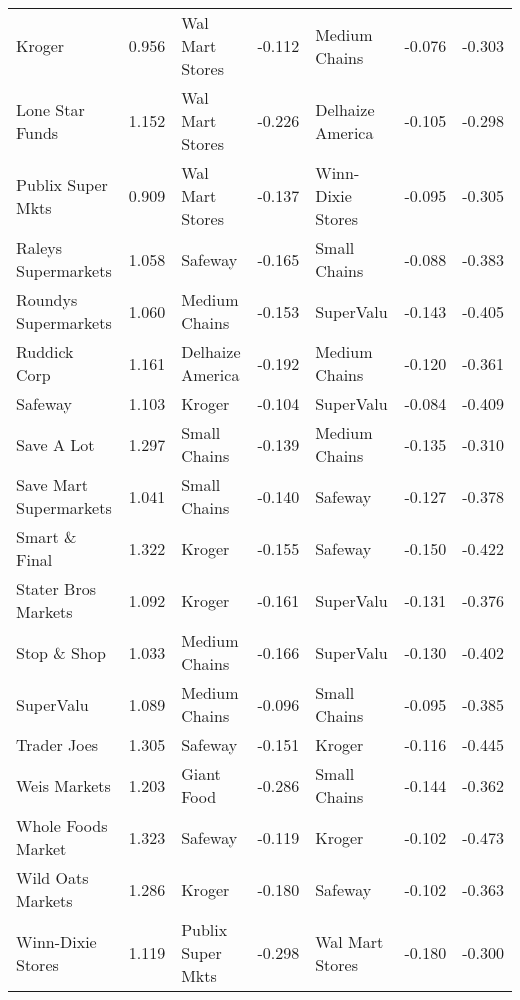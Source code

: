 \begin{table}[htbp]
\begin{tabular}{ll|ll|ll|r}
\textrm{ Kroger  } & 0.956 &\textrm{ Wal Mart Stores } &-0.112 &\textrm{ Medium Chains } &-0.076 & -0.303 \\ 
\textrm{ Lone Star Funds } & 1.152 &\textrm{ Wal Mart Stores } &-0.226 &\textrm{ Delhaize America } &-0.105 & -0.298 \\ 
\textrm{ Publix Super Mkts  } & 0.909 &\textrm{ Wal Mart Stores } &-0.137 &\textrm{ Winn-Dixie Stores  } &-0.095 & -0.305 \\ 
\textrm{ Raleys Supermarkets } & 1.058 &\textrm{ Safeway  } &-0.165 &\textrm{ Small Chains } &-0.088 & -0.383 \\ 
\textrm{ Roundys Supermarkets  } & 1.060 &\textrm{ Medium Chains } &-0.153 &\textrm{ SuperValu  } &-0.143 & -0.405 \\ 
\textrm{ Ruddick Corp } & 1.161 &\textrm{ Delhaize America } &-0.192 &\textrm{ Medium Chains } &-0.120 & -0.361 \\ 
\textrm{ Safeway  } & 1.103 &\textrm{ Kroger  } &-0.104 &\textrm{ SuperValu  } &-0.084 & -0.409 \\ 
\textrm{ Save A Lot } & 1.297 &\textrm{ Small Chains } &-0.139 &\textrm{ Medium Chains } &-0.135 & -0.310 \\ 
\textrm{ Save Mart Supermarkets } & 1.041 &\textrm{ Small Chains } &-0.140 &\textrm{ Safeway  } &-0.127 & -0.378 \\ 
\textrm{ Smart \& Final  } & 1.322 &\textrm{ Kroger  } &-0.155 &\textrm{ Safeway  } &-0.150 & -0.422 \\ 
\textrm{ Stater Bros Markets } & 1.092 &\textrm{ Kroger  } &-0.161 &\textrm{ SuperValu  } &-0.131 & -0.376 \\ 
\textrm{ Stop \& Shop } & 1.033 &\textrm{ Medium Chains } &-0.166 &\textrm{ SuperValu  } &-0.130 & -0.402 \\ 
\textrm{ SuperValu  } & 1.089 &\textrm{ Medium Chains } &-0.096 &\textrm{ Small Chains } &-0.095 & -0.385 \\ 
\textrm{ Trader Joes  } & 1.305 &\textrm{ Safeway  } &-0.151 &\textrm{ Kroger  } &-0.116 & -0.445 \\ 
\textrm{ Weis Markets  } & 1.203 &\textrm{ Giant Food } &-0.286 &\textrm{ Small Chains } &-0.144 & -0.362 \\ 
\textrm{ Whole Foods Market } & 1.323 &\textrm{ Safeway  } &-0.119 &\textrm{ Kroger  } &-0.102 & -0.473 \\ 
\textrm{ Wild Oats Markets  } & 1.286 &\textrm{ Kroger  } &-0.180 &\textrm{ Safeway  } &-0.102 & -0.363 \\ 
\textrm{ Winn-Dixie Stores  } & 1.119 &\textrm{ Publix Super Mkts  } &-0.298 &\textrm{ Wal Mart Stores } &-0.180 & -0.300 \\ 

\end{tabular}
\end{table}
